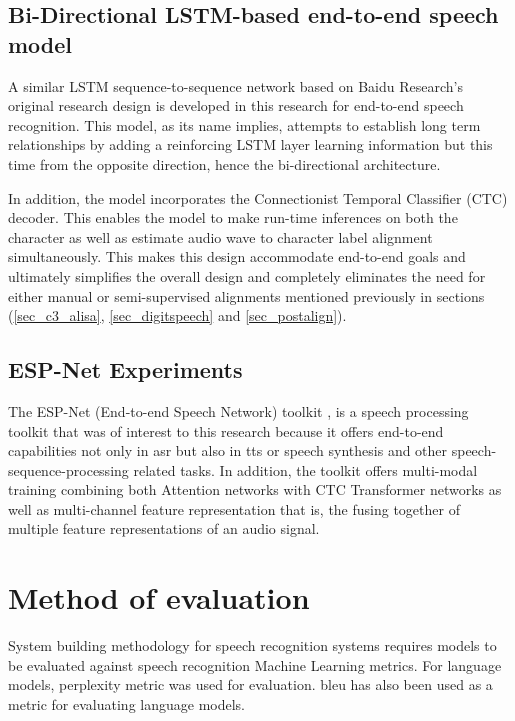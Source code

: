 \subsection{Bi-Directional LSTM-based end-to-end speech model}\label{sec_be2e}
A similar LSTM sequence-to-sequence network based on Baidu Research’s original research design \citep{hannun2014deep} is developed in this research for end-to-end speech recognition.  This model, as its name implies, attempts to establish long term relationships by adding a reinforcing LSTM layer learning information but this time from the opposite direction, hence the bi-directional architecture.  

In addition, the model incorporates the Connectionist Temporal Classifier (CTC) decoder. This enables the model to make run-time inferences on both the character as well as estimate audio wave to character label alignment simultaneously.  This makes this design accommodate end-to-end goals and ultimately simplifies the overall design and completely eliminates the need for either manual or semi-supervised alignments mentioned previously in sections (\ref{sec_c3_alisa}, \ref{sec_digitspeech} and \ref{sec_postalign}).

\subsection{ESP-Net Experiments}\label{c3sec_espnet}
The ESP-Net (End-to-end Speech Network) toolkit \citep{watanabe2018espnet}, is a speech processing toolkit that was of interest to this research because it offers end-to-end capabilities not only in \acrfull{asr} but also in \acrfull{tts} or speech synthesis and other speech-sequence-processing related tasks.  In addition, the toolkit offers multi-modal training combining both Attention networks \cite{vaswani2017attention} with CTC Transformer networks as well as multi-channel feature representation that is, the fusing together of multiple feature representations of an audio signal.

\section{Method of evaluation}
System building methodology \citep{nunamaker1990systems} for speech recognition systems requires models to be evaluated against speech recognition Machine Learning metrics.  For language models, perplexity metric was used for evaluation.  \acrfull{bleu}\citep{papineni2002bleu} has also been used as a metric for evaluating language models.

